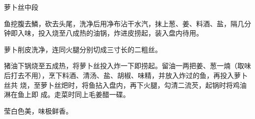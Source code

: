 %
%
%
%
%
%
%
\begin{recipe}[银丝中段]{萝卜丝中段}

\ingredients


\preparation

\step 鱼挖腹去鱗，砍去头尾，洗净后用净布沾干水汽，抹上葱、姜、料酒、盐，隔几分
钟即入味，投入烧至八成热的油锅，炸进皮捞起，装入盘内待用。

\step 萝卜削皮洗净，连同火腿分别切成三寸长的二粗丝。

\step 猪油下锅烧至五成热，将萝卜丝投入炸一下即捞起。留油一两把姜、葱一煵（取味
后打去不用），烹下料酒、清汤、盐、胡椒、味精，并放入炸过的鱼，再投入萝卜丝共
烧，至萝卜丝𤆵时，将鱼拈入盘内，再下火腿，勾清二流芡，起锅时将鸡油淋在鱼上即
成。走菜时同上毛姜醋一碟。

\features

莹白色美，味极鲜香。

\end{recipe}

